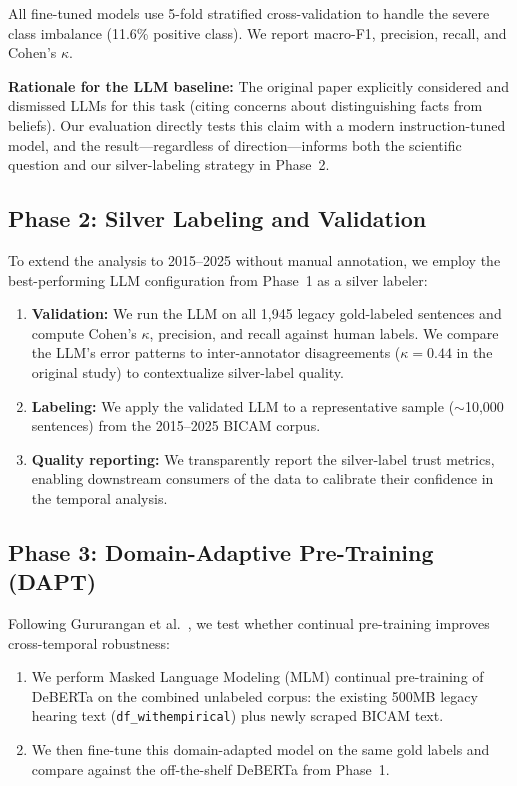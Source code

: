 \documentclass[11pt,a4paper]{article}
\begin{document}
All fine-tuned models use 5-fold stratified cross-validation to handle the severe class imbalance (11.6\% positive class). We report macro-F1, precision, recall, and Cohen's $\kappa$.

\textbf{Rationale for the LLM baseline:} The original paper explicitly considered and dismissed LLMs for this task (citing concerns about distinguishing facts from beliefs). Our evaluation directly tests this claim with a modern instruction-tuned model, and the result---regardless of direction---informs both the scientific question and our silver-labeling strategy in Phase~2.

\subsection{Phase 2: Silver Labeling and Validation}

To extend the analysis to 2015--2025 without manual annotation, we employ the best-performing LLM configuration from Phase~1 as a silver labeler:

\begin{enumerate}[nosep]
  \item \textbf{Validation:} We run the LLM on all 1,945 legacy gold-labeled sentences and compute Cohen's $\kappa$, precision, and recall against human labels. We compare the LLM's error patterns to inter-annotator disagreements ($\kappa = 0.44$ in the original study) to contextualize silver-label quality.
  \item \textbf{Labeling:} We apply the validated LLM to a representative sample ($\sim$10,000 sentences) from the 2015--2025 BICAM corpus.
  \item \textbf{Quality reporting:} We transparently report the silver-label trust metrics, enabling downstream consumers of the data to calibrate their confidence in the temporal analysis.
\end{enumerate}

\subsection{Phase 3: Domain-Adaptive Pre-Training (DAPT)}

Following Gururangan et al.~\cite{gururangan2020}, we test whether continual pre-training improves cross-temporal robustness:

\begin{enumerate}[nosep]
  \item We perform Masked Language Modeling (MLM) continual pre-training of DeBERTa on the combined unlabeled corpus: the existing 500MB legacy hearing text (\texttt{df\_withempirical}) plus newly scraped BICAM text.
  \item We then fine-tune this domain-adapted model on the same gold labels and compare against the off-the-shelf DeBERTa from Phase~1.
\end{enumerate}
\end{document}
